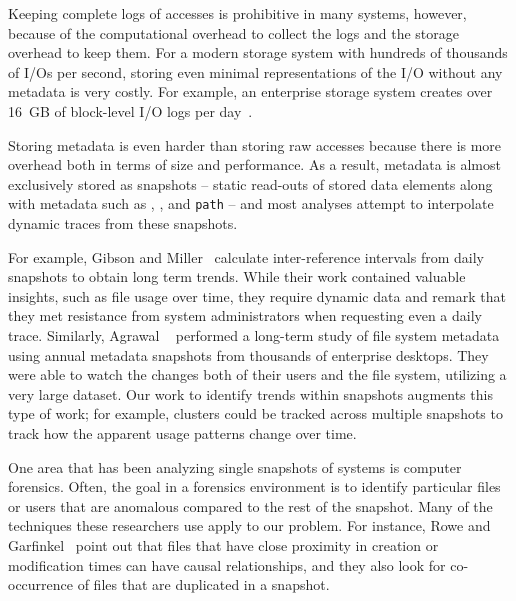 Keeping complete logs of accesses is prohibitive in many systems, however,
because of the computational overhead to collect the logs and the storage
overhead to keep them.  For a modern storage system with hundreds of thousands
of I/Os per second, storing even minimal representations of the I/O without any
metadata is very costly.  For example, an enterprise storage system creates over
16~GB of block-level I/O logs per day~\cite{hands}.

Storing metadata is even harder than storing raw accesses because there
is more overhead both in terms of size and performance.  As a result, metadata
is almost exclusively stored as snapshots -- static read-outs of stored data
elements along with metadata such as \atime, \ctime, and \texttt{path} -- and most
analyses attempt to interpolate dynamic traces from these snapshots.  

For example, Gibson and Miller~\cite{gibson:cmg98} calculate inter-reference
intervals from daily snapshots to
obtain long term trends.  While their work contained valuable insights, such as file
usage over time, they require dynamic data and remark that they met resistance
from system administrators when requesting even a
daily trace.  
Similarly, Agrawal \etal~\cite{agrawal:fast07} performed a long-term study of file system metadata using annual
metadata snapshots from thousands of enterprise desktops.  They were able to
watch the changes both of their users and the file system, utilizing a very large dataset.  Our work to identify
trends within snapshots augments this type of work; for example, clusters could
be tracked across multiple snapshots to track how the apparent usage patterns
change over time.



One area that has been analyzing single snapshots of systems is computer
forensics.  Often, the goal in a forensics environment is to identify particular
files or users that are anomalous compared to the rest of the
snapshot.  Many of the techniques these researchers use apply
to our problem.  For instance, Rowe and Garfinkel~\cite{rowe:icst11} point out that
files that have close proximity in creation or modification times can have
causal relationships, and they also look for co-occurrence of files that are
duplicated in a snapshot.                

